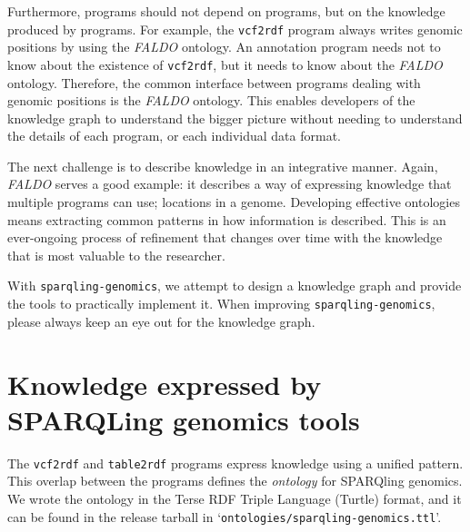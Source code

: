   Furthermore, programs should not depend on programs, but on the knowledge
  produced by programs.  For example, the \texttt{vcf2rdf} program always
  writes genomic positions by using the \emph{FALDO} ontology.  An annotation
  program needs not to know about the existence of \texttt{vcf2rdf}, but it
  needs to know about the \emph{FALDO} ontology.  Therefore, the common
  interface between programs dealing with genomic positions is the \emph{FALDO}
  ontology.  This enables developers of the knowledge graph to understand
  the bigger picture without needing to understand the details of each
  program, or each individual data format.

  The next challenge is to describe knowledge in an integrative manner.  Again,
  \emph{FALDO} serves a good example: it describes a way of expressing knowledge
  that multiple programs can use; locations in a genome.  Developing effective
  ontologies means extracting common patterns in how information is described.
  This is an ever-ongoing process of refinement that changes over time with the
  knowledge that is most valuable to the researcher.

  With \texttt{sparqling-genomics}, we attempt to design a knowledge graph and
  provide the tools to practically implement it.  When improving
  \texttt{sparqling-genomics}, please always keep an eye out for the knowledge
  graph.

\section{Knowledge expressed by SPARQLing genomics tools}

  \begin{sloppypar}
  The \texttt{vcf2rdf} and \texttt{table2rdf} programs express knowledge using
  a unified pattern.  This overlap between the programs defines the
  \emph{ontology} for SPARQling genomics.  We wrote the ontology in the
  Terse RDF Triple Language (Turtle) format, and it can be found in the release
  tarball in \mbox{`\texttt{ontologies/sparqling-genomics.ttl}'}.
  \end{sloppypar}
